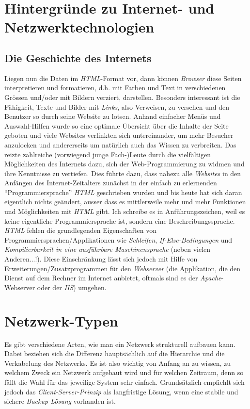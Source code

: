 \documentclass[b5paper,10pt,dvips,fleqn,titlepage,twoside]{book}
\begin{document}
\chapter{Hintergründe zu Internet- und Netzwerktechnologien}
\section{Die Geschichte des Internets}
Liegen nun die Daten im \emph{HTML}-Format vor, dann können \emph{Browser} diese Seiten interpretieren und formatieren, d.h. mit Farben und Text in verschiedenen Grössen und/oder mit Bildern verziert, darstellen. Besonders interessant ist die Fähigkeit, Texte und Bilder mit \emph{Links}, also Verweisen, zu versehen und den Benutzer so durch seine Website zu lotsen. Anhand einfacher Menüs und Auswahl-Hilfen wurde so eine optimale Übersicht über die Inhalte der Seite geboten und viele Websites verlinkten sich untereinander, um mehr Besucher anzulocken und andererseits um natürlich auch das Wissen zu verbreiten.\newline 
Das reizte zahlreiche (vorwiegend junge Fach-)Leute durch die vielfältigen Möglichkeiten des Internets dazu, sich der Web-Programmierung zu widmen und ihre Kenntnisse zu vertiefen. Dies führte dazu, dass nahezu alle \emph{Websites} in den Anfängen des Internet-Zeitalters zunächst in der einfach zu erlernenden ``Programmiersprache'' \emph{HTML} geschrieben wurden und bis heute hat sich daran eigentlich nichts geändert, ausser dass es mittlerweile mehr und mehr Funktionen und Möglichkeiten mit \emph{HTML} gibt. Ich schreibe es in Anführungszeichen, weil es keine eigentliche Programmiersprache ist, sondern eine Beschreibungssprache. \textit{HTML} fehlen die grundlegenden Eigenschaften von Programmiersprachen/Applikationen wie \emph{Schleifen}, \emph{If-Else-Bedingungen} und  \emph{Kompilierbarkeit in eine ausführbare Maschinensprache} (neben vielen Anderen...!). Diese Einschränkung lässt sich jedoch mit Hilfe von Erweiterungen/Zusatzprogrammen für den \emph{Webserver} (die Applikation, die den Dienst auf dem Rechner im Internet anbietet, oftmals sind es der \emph{Apache}-Webserver oder der \emph{IIS}) umgehen.
\chapter{Netzwerk-Typen}
Es gibt verschiedene Arten, wie man ein Netzwerk strukturell aufbauen kann. Dabei beziehen sich die Differenz hauptsächlich auf die Hierarchie und die Verkabelung des Netzwerks. Es ist also wichtig von Anfang an zu wissen, zu welchem Zweck ein Netzwerk aufgebaut wird und für welchen Zeitraum, denn so fällt die Wahl für das jeweilige System sehr einfach. Grundsätzlich empfiehlt sich jedoch das \emph{Client-Server-Prinzip} als langfristige Lösung, wenn eine stabile und sichere \emph{Backup-Lösung} vorhanden ist.
\end{document}
